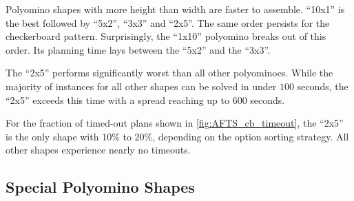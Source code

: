 Polyomino shapes with more height than width are faster to assemble.
``10x1'' is the best followed by ``5x2'', ``3x3'' and ``2x5''.
The same order persists for the checkerboard pattern.
Surprisingly, the ``1x10'' polyomino breaks out of this order.
Its planning time lays between the ``5x2'' and the ``3x3''.

The ``2x5'' performs significantly worst than all other polyominoes.
While the majority of instances for all other shapes can be solved in under $100$ seconds, the ``2x5'' exceeds this time with a spread reaching up to $600$ seconds.

For the fraction of timed-out plans shown in \autoref{fig:AFTS_cb_timeout}, the ``2x5'' is the only shape with $10\%$ to $20\%$, depending on the option sorting strategy.
All other shapes experience nearly no timeouts.

\subsection{Special Polyomino Shapes}
\label{sec:special_poly}

